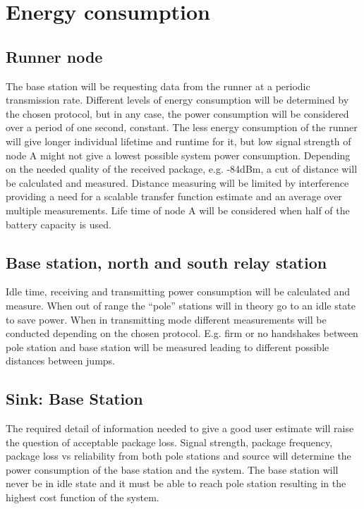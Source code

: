 \section{Energy consumption}\label{sc:powerConsumption}
\subsection{Runner node}
The base station will be requesting data from the runner at a periodic transmission rate. Different levels of energy consumption will be determined by the chosen protocol, but in any case, the power consumption will be considered over a period of one second, constant. The less energy consumption of the runner will give longer individual lifetime and runtime for it, but low signal strength of node A might not give a lowest possible system power consumption. Depending on the needed quality of the received package, e.g. -84dBm, a cut of distance will be calculated and measured. Distance measuring will be limited by interference providing a need for a scalable transfer function estimate and an average over multiple measurements. Life time of node A will be considered when half of the battery capacity is used.

\subsection{Base station, north and south relay station}\label{sc:relayStations}

Idle time, receiving and transmitting power consumption will be calculated and measure. When out of range the “pole” stations will in theory go to an idle state to save power. When in transmitting mode different measurements will be conducted depending on the chosen protocol. E.g. firm or no handshakes between pole station and base station will be measured leading to different possible distances between jumps.

\subsection{Sink: Base Station}\label{sc:sinkBaseStation}
The required detail of information needed to give a good user estimate will raise the question of acceptable package loss. Signal strength, package frequency, package loss vs reliability from both pole stations and source will determine the power consumption of the base station and the system. The base station will never be in idle state and it must be able to reach pole station resulting in the highest cost function of the system.
